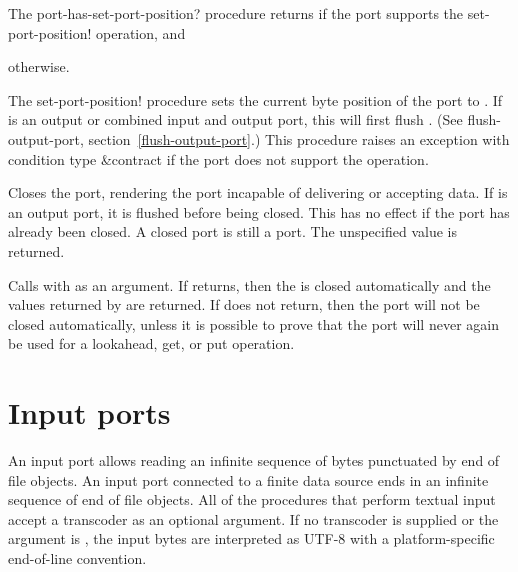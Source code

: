 \begin{entry}{%

   
The {\cf port-has-set-port-position?} procedure returns \schtrue{} if the port
supports the {\cf set-port-position!} operation, and \schfalse}
otherwise.
   
The {\cf set-port-position!} procedure sets the current byte position
of the port to .  If  is an output or combined
input and output port, this will first flush .  (See {\cf
  flush-output-port}, section~\ref{flush-output-port}.)
This procedure raises an exception with condition type {\cf\&contract}
if the port does not support the operation.
\end{entry}

\begin{entry}{%
}
   
Closes the port, rendering the port incapable of delivering or
accepting data. If  is an output port, it is flushed before
being closed.  This has no effect if the port has already been closed.
A closed port is still a port. The unspecified value is returned.
\end{entry}

\begin{entry}{%
}
   
  Calls  with  as an argument. If
 returns, then the  is closed automatically and
the values returned by  are returned. If  does not
return, then the port will not be closed automatically, unless it is
possible to prove that the port will never again be used for a
{\cf lookahead}, {\cf get}, or {\cf put} operation.
\end{entry}

\section{Input ports}

An input port allows reading an infinite sequence of bytes punctuated
by end of file objects. An input port connected to a finite data
source ends in an infinite sequence of end of file objects.  All of
the procedures that perform textual input accept a transcoder as an
optional argument. If no transcoder is supplied or the
 argument is \schfalse{}, the input bytes are
interpreted as UTF-8 with a platform-specific end-of-line convention.

